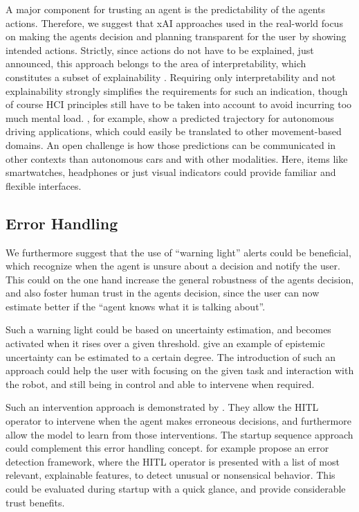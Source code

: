 \documentclass[twoside,11pt]{article}
\begin{document}
\begin{enumerate}
A major component for trusting an agent is the predictability of the agents actions. Therefore, we suggest that xAI approaches used in the real-world focus on making the agents decision and planning transparent for the user by showing intended actions. Strictly, since actions do not have to be explained, just announced, this approach belongs to the area of interpretability, which constitutes a subset of explainability \citep{Dragan:2015:LegibleRobotMotion}. Requiring only interpretability and not explainability strongly simplifies the requirements for such an indication, though of course HCI principles still have to be taken into account to avoid incurring too much mental load. \citet{Caltagarione:2017:DrivingPathGeneration}, for example, show a predicted trajectory for autonomous driving applications, which could easily be translated to other movement-based domains. 
An open challenge is how those predictions can be communicated in other contexts than autonomous cars and with other modalities. Here, items like smartwatches, headphones or just visual indicators could provide familiar and flexible interfaces.

\subsection{Error Handling}
We furthermore suggest that the use of ``warning light'' alerts could be beneficial, which recognize when the agent is unsure about a decision and notify the user. This could on the one hand increase the general robustness of the agents decision, and also foster human trust in the agents decision, since the user can now estimate better if the ``agent knows what it is talking about''.

Such a warning light could be based on uncertainty estimation, and becomes activated when it rises over a given threshold. \citet{JainEtAl:2021:EpistemicUncertaintyPrediction} give an example of epistemic uncertainty can be estimated to a certain degree. The introduction of such an approach could help the user with focusing on the given task and interaction with the robot, and still being in control and able to intervene when required.

Such an intervention approach is demonstrated by \citet{WuEtAl:2021:HITLDRLAutonomousDriving}. They allow the HITL operator to intervene when the agent makes erroneous decisions, and furthermore allow the model to learn from those interventions. 
The startup sequence approach could complement this error handling concept. \citet{LiuGuoMahmud:2021:HITLErrorDetectionFramework} for example propose an error detection framework, where the HITL operator is presented with a list of most relevant, explainable features, to detect unusual or nonsensical behavior. This could be evaluated during startup with a quick glance, and provide considerable trust benefits.\\



\end{enumerate}
\end{document}
